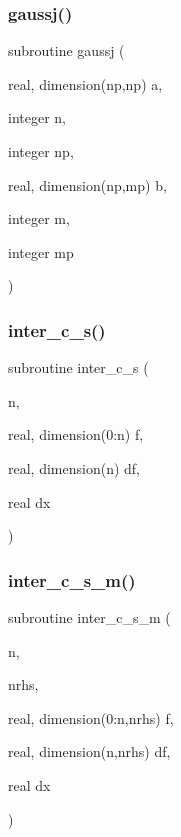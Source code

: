 \subsubsection{\texorpdfstring{gaussj()}{gaussj()}}
{\footnotesize\ttfamily subroutine gaussj (\begin{DoxyParamCaption}\item[{real, dimension(np,np)}]{a,  }\item[{integer}]{n,  }\item[{integer}]{np,  }\item[{real, dimension(np,mp)}]{b,  }\item[{integer}]{m,  }\item[{integer}]{mp }\end{DoxyParamCaption})}

\mbox{\label{ders__n_8f_a428bd77eb265e83b885a22d7ba669be2}} 
\subsubsection{\texorpdfstring{inter\+\_\+c\+\_\+s()}{inter\_c\_s()}}
{\footnotesize\ttfamily subroutine inter\+\_\+c\+\_\+s (\begin{DoxyParamCaption}\item[{}]{n,  }\item[{real, dimension(0\+:n)}]{f,  }\item[{real, dimension(n)}]{df,  }\item[{real}]{dx }\end{DoxyParamCaption})}

\mbox{\label{ders__n_8f_a8db7315af1304ec4ca272240cd16739b}} 
\subsubsection{\texorpdfstring{inter\+\_\+c\+\_\+s\+\_\+m()}{inter\_c\_s\_m()}}
{\footnotesize\ttfamily subroutine inter\+\_\+c\+\_\+s\+\_\+m (\begin{DoxyParamCaption}\item[{}]{n,  }\item[{}]{nrhs,  }\item[{real, dimension(0\+:n,nrhs)}]{f,  }\item[{real, dimension(n,nrhs)}]{df,  }\item[{real}]{dx }\end{DoxyParamCaption})}

